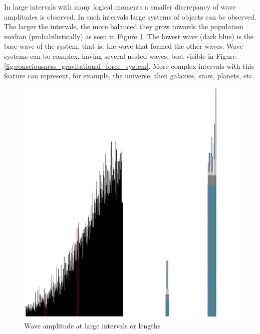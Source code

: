 In large intervals with many logical moments a smaller discrepancy of wave amplitudes is observed. In such intervals large systems of objects can be observed. The larger the intervals, the more balanced they grow towards the population median (probabilistically) as seen in Figure \ref{fig:consciousness_space_subconsciousness}. The lowest wave (dark blue) is the base wave of the system, that is, the wave that formed the other waves. Wave systems can be complex, having several nested waves, best visible in Figure \ref{fig:consciousness_gravitational_force_system}. More complex intervals with this feature can represent, for example, the universe, then galaxies, stars, planets, etc.
	\begin{figure}[H]
	\caption{Wave amplitude at large intervals or lengths}
	\label{fig:consciousness_space_subconsciousness}
	\centering
	\includegraphics[scale=.45]{sections/images/consciousness_space_subconsciousness.jpg}
	\end{figure}

